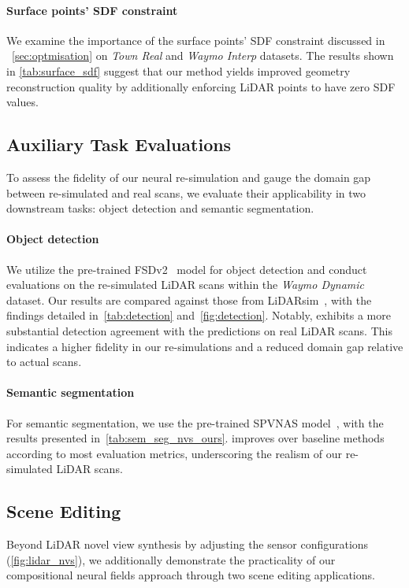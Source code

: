 \paragraph{Surface points' SDF constraint}
We examine the importance of the surface points' SDF constraint discussed in ~\cref{sec:optmisation} on \textit{Town Real} and \textit{Waymo Interp} datasets. The results shown in \cref{tab:surface_sdf} suggest that our method yields improved geometry reconstruction quality by additionally enforcing LiDAR points to have zero SDF values. 


\subsection{Auxiliary Task Evaluations} 
\label{sec:downstream}
To assess the fidelity of our neural re-simulation and gauge the domain gap between re-simulated and real scans, we evaluate their applicability in two downstream tasks: object detection and semantic segmentation.


\paragraph{Object detection}
We utilize the pre-trained FSDv2~\cite{fan2023fsdv2} model for object detection and conduct evaluations on the re-simulated LiDAR scans within the \textit{Waymo Dynamic} dataset. Our results are compared against those from LiDARsim~\cite{manivasagam2020lidarsim}, with the findings detailed in~\cref{tab:detection} and~\cref{fig:detection}. Notably, \dynfl exhibits a more substantial detection agreement with the predictions on real LiDAR scans. This indicates a higher fidelity in our re-simulations and a reduced domain gap relative to actual scans.


\paragraph{Semantic segmentation}
For semantic segmentation, we use the pre-trained SPVNAS model~\cite{tang2020searching}, with the results presented in~\cref{tab:sem_seg_nvs_ours}. \dynfl improves over baseline methods according to most evaluation metrics, underscoring the realism of our re-simulated LiDAR scans.



\subsection{Scene Editing}
Beyond LiDAR novel view synthesis by adjusting the sensor configurations (\cf \cref{fig:lidar_nvs}), we additionally demonstrate the practicality of our compositional neural fields approach through two scene editing applications.

